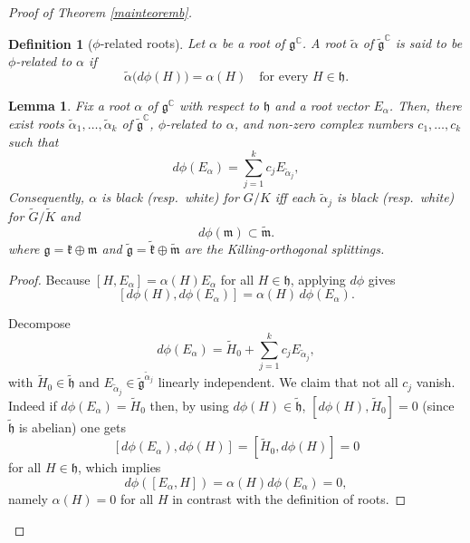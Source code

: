 \documentclass[reqno]{amsart}
\newcommand{\C}{\mathds{C}}
\newtheorem{defin}{Definition}
\newtheorem{lem}[theor]{Lemma}
\begin{document}
\begin{proof}[Proof of Theorem \ref{mainteoremb}]
\begin{defin}[{\(\phi\)-related roots}]
Let \(\alpha\) be a root of \(\mathfrak{g}^{\C}\).
A root \(\tilde\alpha\) of \(\tilde{\mathfrak{g}}^{\C}\) is said to be
\emph{\(\phi\)-related to \(\alpha\)} if
\[
\tilde\alpha\!\bigl(d\phi(H)\bigr)=\alpha(H)
\quad\text{for every }H\in\mathfrak{h}.
\]
\end{defin}

\begin{lem}
 Fix a root \(\alpha\) of \(\mathfrak{g}^{\C}\) with respect to \(\mathfrak{h}\) and a root
vector \(E_\alpha\).
Then, there exist roots \(\tilde\alpha_1,\dots,\tilde\alpha_k\) of \(\tilde{\mathfrak{g}}^{\C}\),  $\phi$-related to $\alpha$, and non-zero complex numbers
\(c_1,\dots,c_k\) such that
\begin{equation}\label{linearcomb}
d\phi(E_\alpha)=\sum_{j=1}^{k} c_j E_{\tilde\alpha_j},
\end{equation}
Consequently, 
\(\alpha\) is black (resp.\ white) for \(G/K\) iff each \(\tilde\alpha_j\) is black (resp.\ white) for
\(\tilde G/\tilde K\) and 
\begin{equation}\label{inclm}
d\phi(\mathfrak{m}) \subset \tilde{\mathfrak{m}}.
\end{equation}
where
\(\mathfrak{g}=\mathfrak{k}\oplus\mathfrak{m}\) and
\(\tilde{\mathfrak{g}}=\tilde{\mathfrak{k}}\oplus\tilde{\mathfrak{m}}\)
are the Killing-orthogonal splittings.
\end{lem}




\begin{proof}
Because \([H,E_\alpha]=\alpha(H)E_\alpha\) for all \(H\in\mathfrak{h}\), applying \(d\phi\) gives
\begin{equation}\label{phiHalpha}
[d\phi(H),d\phi(E_\alpha)] = \alpha(H)\,d\phi(E_\alpha).
\end{equation}

 Decompose
\begin{equation}\label{deocmposdfiE}
d\phi(E_\alpha)=\tilde H_0 + \sum_{j=1}^{k} c_j E_{\tilde\alpha_j},
\end{equation}
with \(\tilde H_0\in\tilde{\mathfrak{h}}\) and
\(E_{\tilde\alpha_j}\in\tilde{\mathfrak{g}}^{\tilde\alpha_j}\) linearly independent.
We claim that not all $c_j$ vanish.
Indeed if $d\phi (E_\alpha)=\tilde H_0$ then,  by using   $d\phi(H)\in \tilde{\mathfrak{h}}$,  $[d \phi(H), \tilde H_0] = 0$ (since $\tilde{\mathfrak{h}}$ is abelian) one gets
$$[d\phi (E_\alpha), d\phi (H)]=[\tilde H_0, d\phi (H)]=0$$
for all $H\in {\mathfrak{h}}$, which implies 
$$d\phi([E_\alpha, H])=\alpha (H)d\phi (E_\alpha)=0,$$
namely $\alpha (H)=0$ for all $H$ in contrast with the definition of roots.


\end{proof}
\end{proof}
\end{document}
